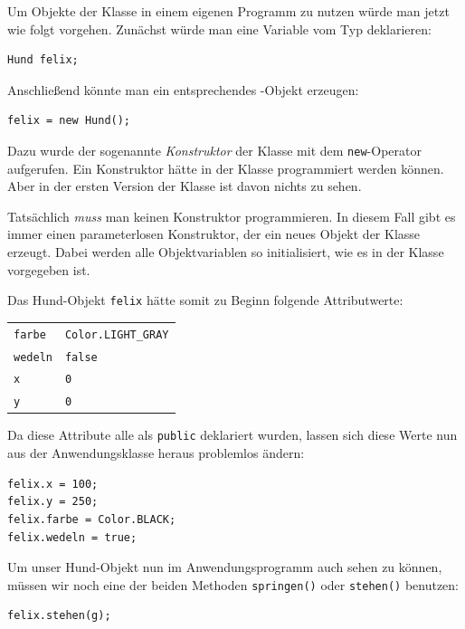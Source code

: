 Um Objekte der Klasse  in einem eigenen Programm zu nutzen würde
man jetzt wie folgt vorgehen. Zunächst würde man eine Variable vom Typ 
deklarieren:

\begin{lstlisting}
Hund felix;
\end{lstlisting}

Anschließend könnte man ein entsprechendes -Objekt erzeugen:

\begin{lstlisting}
felix = new Hund();
\end{lstlisting}

Dazu wurde der sogenannte \emph{Konstruktor} der Klasse mit dem
\lstinline|new|-Operator aufgerufen. Ein Konstruktor hätte in der Klasse
 programmiert werden können. Aber in der ersten Version der Klasse
 ist davon nichts zu sehen.

Tatsächlich \emph{muss} man keinen Konstruktor programmieren. In diesem Fall
gibt es immer einen parameterlosen Konstruktor, der ein neues Objekt der Klasse
erzeugt. Dabei werden alle Objektvariablen so initialisiert, wie es in der
Klasse vorgegeben ist.

Das Hund-Objekt \lstinline|felix| hätte somit zu Beginn folgende Attributwerte:

\begin{tabular}{ll}
\lstinline|farbe| & \lstinline|Color.LIGHT_GRAY| \\
\lstinline|wedeln| \hspace{5mm} & \lstinline|false| \\
\lstinline|x| & \lstinline|0| \\
\lstinline|y| & \lstinline|0| \\
\end{tabular}

Da diese Attribute alle als \lstinline|public| deklariert wurden, lassen sich
diese Werte nun aus der Anwendungsklasse heraus problemlos ändern:

\begin{lstlisting}
felix.x = 100;
felix.y = 250;
felix.farbe = Color.BLACK;
felix.wedeln = true;
\end{lstlisting}

Um unser Hund-Objekt nun im Anwendungsprogramm auch sehen zu können, müssen wir
noch eine der beiden Methoden \lstinline|springen()| oder \lstinline|stehen()|
benutzen:

\begin{lstlisting}
felix.stehen(g);
\end{lstlisting}

